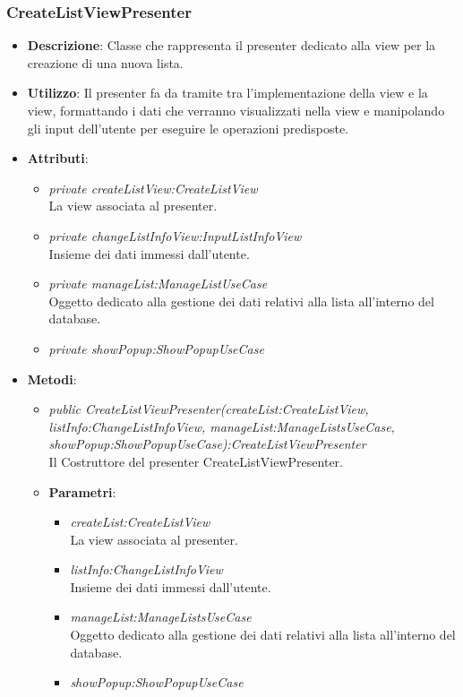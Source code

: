 \subsubsection{CreateListViewPresenter}
\begin{itemize}
\item \textbf{Descrizione}: Classe che rappresenta il presenter dedicato alla view per la creazione di una nuova lista.
\item \textbf{Utilizzo}: Il presenter fa da tramite tra l'implementazione della view e la view, formattando i dati che verranno visualizzati nella view e manipolando gli input dell'utente per eseguire le operazioni predisposte.
\item \textbf{Attributi}: 
	\begin{itemize}
	\item \textit{private createListView:CreateListView}\\
	La view associata al presenter.
	\item \textit{private changeListInfoView:InputListInfoView}\\
	Insieme dei dati immessi dall'utente.
	\item \textit{private manageList:ManageListUseCase}\\
	Oggetto dedicato alla gestione dei dati relativi alla lista all'interno del database.
	\item \textit{private showPopup:ShowPopupUseCase}\\
	
	\end{itemize}
\item \textbf{Metodi}:
	\begin{itemize}
	\item \textit{public CreateListViewPresenter(createList:CreateListView, listInfo:ChangeListInfoView, manageList:ManageListsUseCase, showPopup:ShowPopupUseCase):CreateListViewPresenter}\\
		Il Costruttore del presenter CreateListViewPresenter.
		\item{\textbf{Parametri}: \begin{itemize}
		\item \textit{createList:CreateListView}\\
			La view associata al presenter.
		\item \textit{listInfo:ChangeListInfoView}\\
			Insieme dei dati immessi dall'utente.
		\item \textit{manageList:ManageListsUseCase}\\
			Oggetto dedicato alla gestione dei dati relativi alla lista all'interno del database.
		\item \textit{showPopup:ShowPopupUseCase}\\
		

\end{itemize}}
\end{itemize}
\end{itemize}
